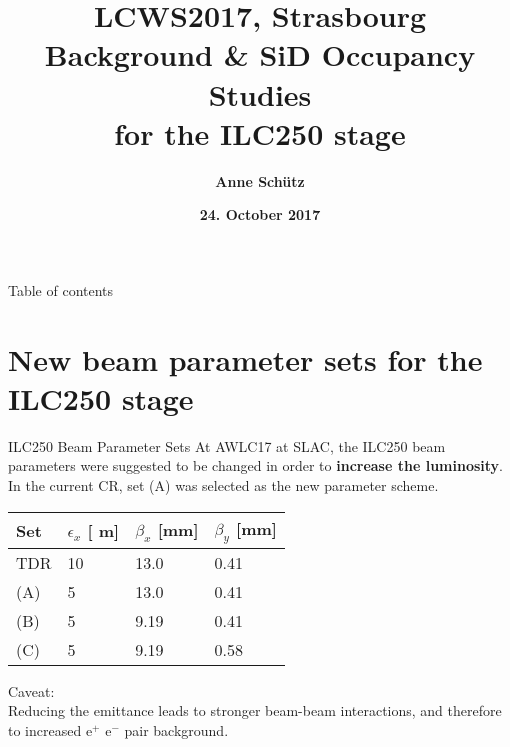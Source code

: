 \documentclass[xcolor={dvipsnames}]{beamer}
\title[ILC250 backgrounds \& SiD Occupancy]{\textbf{\alert{LCWS2017, Strasbourg} \\ \vspace*{0.5cm}  Background \& SiD Occupancy Studies\\for the ILC250 stage}}
\author{\textbf{Anne Sch\"utz}}
\institute{\textbf{DESY}}
\date{\textbf{24. October 2017}}
\newcommand{\electron}{e$^-$\xspace}
\newcommand{\positron}{e$^+$\xspace}
\newcommand{\murm}{%
  \ifmmode
    \mathchoice
        {\hbox{\normalsize\textmu}}
        {\hbox{\normalsize\textmu}}
        {\hbox{\scriptsize\textmu}}
        {\hbox{\tiny\textmu}}%
  \else
    \textmu
  \fi
}
\begin{document}
{
\begin{frame}
  \titlepage
\end{frame}
}
\setcounter{tocdepth}{2}
\begin{frame}{Table of contents}
  \tableofcontents
\end{frame}


\section{New beam parameter sets for the ILC250 stage}

\begin{frame}{ILC250 Beam Parameter Sets}
At AWLC17 at SLAC, the ILC250 beam parameters were suggested to be changed in order to \textbf{increase the luminosity}.\\
In the current CR, set (A) was selected as the new parameter scheme.
 \begin{table}
\label{tab:Parameters}
\centering
\begin{tabularx}{0.55\textwidth}{llll}
\hline\hline
\textbf{Set}  & \textbf{$\epsilon_x$ [\murm m]} & \textbf{$\beta_x$ [mm]} & \textbf{$\beta_y$ [mm]}\\
\hline
\cline{1-4}
\hline
 TDR & 10 & 13.0 & 0.41\\
 \alert{(A)} & 5 & 13.0 & 0.41\\
 (B) & 5 & 9.19 & 0.41\\
 (C) & 5 & 9.19 & 0.58\\
\hline\hline
\end{tabularx}
\end{table}
\alert{Caveat:\\
Reducing the emittance leads to stronger beam-beam interactions, and therefore to increased \positron \electron pair background.}
\end{frame}
\end{document}
